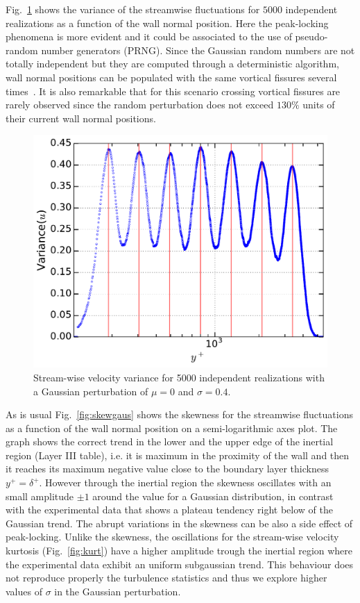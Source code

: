 \documentclass[aps,reprint,amsmath,amssymb,pra]{revtex4-1}%
\begin{document}
Fig.~\ref{fig:varigaus} shows the variance of the streamwise fluctuations for $5000$ independent realizations as a function of the wall normal position. Here the peak-locking phenomena is more evident and it could be associated to the use of pseudo-random number generators (PRNG). Since the Gaussian random numbers are not totally independent but they are computed through a deterministic algorithm, wall normal positions can be populated with the same vortical fissures several times~\cite{nm}. It is also remarkable that for this scenario crossing vortical fissures are rarely observed since the random perturbation does not exceed $130\%$ units of their current wall normal positions. 

\begin{figure}[b]
\includegraphics[scale=0.46]{figures/variance_5000_assembles}
\caption{\label{fig:varigaus} Stream-wise velocity variance for 5000 independent realizations with a Gaussian perturbation of $\mu=0$ and $\sigma=0.4$.}
\end{figure}
As is usual Fig.~\ref{fig:skewgaus} shows the skewness for the streamwise fluctuations as a function of the wall normal position on a semi-logarithmic axes plot. The graph shows the correct trend in the lower and the upper edge of the inertial region (Layer III table), i.e. it is maximum in the proximity of the wall and then it reaches its maximum negative value close to the boundary layer thickness $y^+=\delta^+$. However through the inertial region the skewness oscillates with an small amplitude $\pm 1$ around the value for a Gaussian distribution, in contrast with the experimental data that shows a plateau tendency right below of the Gaussian trend. The abrupt variations in the skewness can be also a side effect of peak-locking. Unlike the skewness, the oscillations for the stream-wise velocity kurtosis (Fig.~\ref{fig:kurt}) have a higher amplitude trough the inertial region where the experimental data exhibit an uniform subgaussian trend. This behaviour does not reproduce properly the turbulence statistics and thus we explore higher values of $\sigma$ in the Gaussian perturbation.\\
\end{document}
